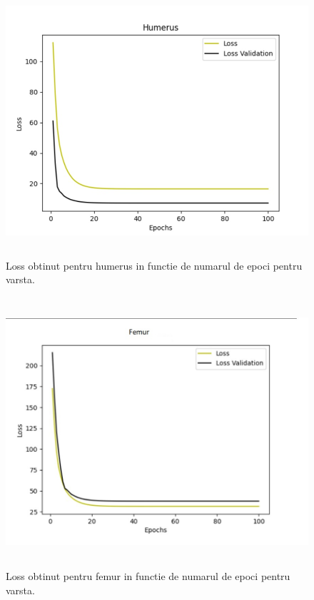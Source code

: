 \documentclass[runningheads,a4paper,11pt]{report}
\begin{document}
\begin{figure}[h!]
\centerline{
\includegraphics[height=10cm]{Imagini/humerus_loss_age.png}}
\caption{Loss obtinut pentru humerus in functie de numarul de epoci pentru varsta.}
\label{fig}
\end{figure}

\begin{figure}[h!]
\centerline{
\includegraphics[height=10cm]{Imagini/femur_loss_age.png}}
\caption{Loss obtinut pentru femur in functie de numarul de epoci pentru varsta.}
\label{fig}
\end{figure}
\end{document}
